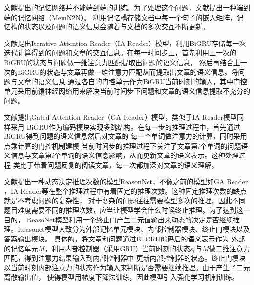 文献\cite{memory network}提出的记忆网络并不能端到端的训练。为了处理这个问题，文献\cite{MemN2N}提出一种端到端的记忆网络（MemN2N）。
利用记忆槽存储文档中每一个句子的嵌入矩阵，记忆槽的状态以及问题的语义信息会随着与文档的多次交互不断更新。

文献\cite{IAReader}提出Iterative Attention Reader（IA Reader）模型，利用BiGRU存储每一次
迭代计算得到的问题和文章的交互信息。在每一时间步上，首先利用上一次的BiGRU的状态与问题做一维注意力匹配提取出问题的语义信息，
然后再结合上一次的BiGRU的状态与文章再做一维注意力匹配从而提取出文章的语义信息。将问题与文章的语义信息
通过各自的门控单元作为BiGRU当前时刻的输入，其中门控单元采用前馈神经网络用来解决当前时间步下问题和文章的语义信息提取不充分的问题。

文献\cite{GAReader}提出Gated Attention Reader（GA Reader）模型，类似于IA Reader模型同样采用
BiGRU作为编码模块实现多跳结构。在每一步的推理过程中，首先通过BiGRU得到问题的语义信息然后对文章的
每一个单词做注意力的计算，同时采用点乘计算的门控机制建模
当前时间步的推理过程下关注了文章第$i$个单词的问题语义信息与文章第$i$个单词的语义信息影响，从而更新文章的语义表示。这种处理过程
类比于带着问题反复的阅读文章，每一次都加深对文章的语义理解。

文献\cite{Reasonet}提出一种动态决定推理次数的模型ReasonNet，不像之前的模型如GA Reader
，IA Reader等在整个推理过程中有着固定的推理次数。这种固定推理次数的缺点就是不考虑问题的复杂性，
对于复杂的问题往往需要模型多次的推理，因此不同题目难度需要不同的推理次数，应当让模型学会什么时候终止推理。为了达到这一目的，
ReasoNet模型利用一个终止门产生二元值输出来动态的决定是否继续推理。Reasonet模型大致分为外部记忆单元模块、内部控制器模块、终止门模块以及答案输出模块。
具体的，将文章和问题通过Bi-GRU编码后的语义表示作为
外部的记忆单元$M$，利用内部控制器（采用GRU）当前时刻的状态$s_t$与$M$做二维注意力匹配，得到注意力结果输入到内部控制器中
更新内部控制器的状态。终止门模块以当前时刻内部注意力的状态作为输入来判断是否需要继续推理。由于产生了二元离散输出值，
使得模型用梯度下降法训练，因此模型引入强化学习机制训练。

